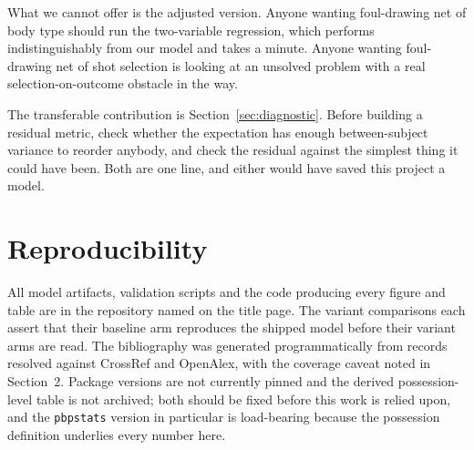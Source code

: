 \documentclass[11pt,a4paper]{article}
\begin{document}
What we cannot offer is the adjusted version. Anyone wanting foul-drawing net of
body type should run the two-variable regression, which performs
indistinguishably from our model and takes a minute. Anyone wanting foul-drawing
net of shot selection is looking at an unsolved problem with a real
selection-on-outcome obstacle in the way.

The transferable contribution is Section~\ref{sec:diagnostic}. Before building a
residual metric, check whether the expectation has enough between-subject variance
to reorder anybody, and check the residual against the simplest thing it could
have been. Both are one line, and either would have saved this project a model.

\section*{Reproducibility}

All model artifacts, validation scripts and the code producing every figure and
table are in the repository named on the title page. The variant comparisons each
assert that their baseline arm reproduces the shipped model before their variant
arms are read. The bibliography was generated programmatically from records
resolved against CrossRef and OpenAlex, with the coverage caveat noted in
Section~2. Package versions are not currently pinned and the derived
possession-level table is not archived; both should be fixed before this work is
relied upon, and the \texttt{pbpstats} version in particular is load-bearing
because the possession definition underlies every number here.


\end{document}
